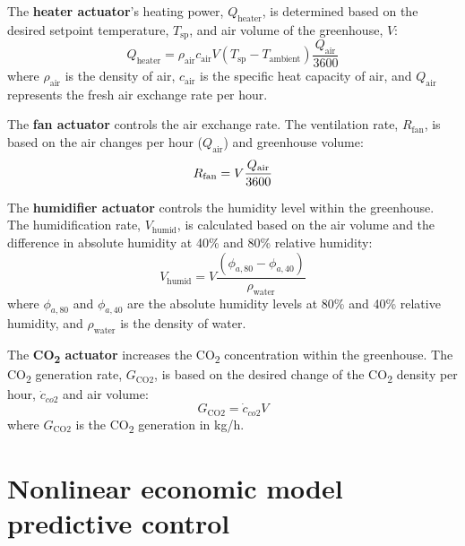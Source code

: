 \documentclass[conference]{IEEEtran}
\begin{document}
The \textbf{heater actuator}'s heating power, \( Q_{\text{heater}} \), is determined based on the desired setpoint temperature, \( T_{\text{sp}} \), and air volume of the greenhouse, \( V \):
\begin{equation}
    Q_{\text{heater}} = \rho_{\text{air}}  c_{\text{air}}  V  (T_{\text{sp}} - T_{\text{ambient}})  \frac{Q_{\text{air}}}{3600}
\end{equation}
where \( \rho_{\text{air}} \) is the density of air, \( c_{\text{air}} \) is the specific heat capacity of air, and \( Q_{\text{air}} \) represents the fresh air exchange rate per hour.

The \textbf{fan actuator} controls the air exchange rate. The ventilation rate, \( R_{\text{fan}} \), is based on the
air changes per hour (\( Q_{\text{air}} \)) and greenhouse volume:
\begin{equation}
    R_{\text{fan}} = V  \frac{\text{\( Q_{\text{air}} \)}}{3600}
\end{equation}

The \textbf{humidifier actuator} controls the humidity level within the greenhouse. The humidification rate, \( V_{\text{humid}} \), is calculated based on the air volume and the difference in absolute humidity at 40\% and 80\% relative humidity:
\begin{equation}
    V_{\text{humid}} = V  \frac{(\phi_{a, 80} - \phi_{a, 40})}{\rho_{\text{water}}}
\end{equation}
where \( \phi_{a, 80} \) and \( \phi_{a, 40} \) are the absolute humidity levels at 80\% and 40\% relative humidity, and \( \rho_{\text{water}} \) is the density of water.

The \textbf{CO\textsubscript{2} actuator} increases the CO\textsubscript{2} concentration within the greenhouse. The CO\textsubscript{2} generation rate, \( G_{\text{CO2}} \), is based on the desired change of the CO\textsubscript{2} density per hour, \( \dot{c}_{co2} \) and air volume:
\begin{equation}
    G_{\text{CO2}} = \dot{c}_{co2}  V
\end{equation}
where \( G_{\text{CO2}} \) is the CO\textsubscript{2} generation in kg/h.


\section{Nonlinear economic model predictive control}\label{sec:mpc}
\end{document}

